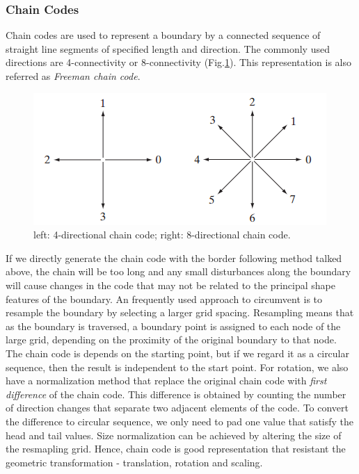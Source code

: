 \subsubsection{Chain Codes}
Chain codes are used to represent a boundary by a connected sequence of straight line segments of specified length and direction. The commonly used directions are 4-connectivity or 8-connectivity (Fig.\ref{fig:10direction}). This representation is also referred as \emph{Freeman chain code}.
\begin{figure}[h!]
	\centering
	\includegraphics[width=0.45\linewidth]{myfigure/p10/direction.png}
	\caption{left: 4-directional chain code; right: 8-directional chain code.}
	\label{fig:10direction}
\end{figure}
If we directly generate the chain code with the border following method talked above, the chain will be too long and any small disturbances along the boundary will cause changes in the code that may not be related to the principal shape features of the boundary. An frequently used approach to circumvent is to resample the boundary by selecting a larger grid spacing. Resampling means that as the boundary is traversed, a boundary point is assigned to each node of the large grid, depending on the proximity of the original boundary to that node. The chain code is depends on the starting point, but if we regard it as a circular sequence, then the result is independent to the start point. For rotation, we also have a normalization method that replace the original chain code with \emph{first difference} of the chain code. This difference is obtained by counting the number of direction changes that separate two adjacent elements of the code. To convert the difference to circular sequence, we only need to pad one value that satisfy the head and tail values. Size normalization can be achieved by altering the size of the resmapling grid. Hence, chain code is good representation that resistant the geometric transformation - translation, rotation and scaling.
